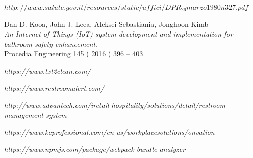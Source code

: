 \documentclass[12pt]{article}
\begin{document}
\begin{thebibliography}{9}
\textit{$http://www.salute.gov.it/resources/static/uffici/DPR_26marzo1980n327.pdf$}

Dan D. Kooa, John J. Leea, Aleksei Sebastiania, Jonghoon Kimb \\
\textit{An Internet-of-Things (IoT) system development and
implementation for bathroom safety enhancement}.\\
Procedia Engineering 145 ( 2016 ) 396 – 403 

\textit{https://www.txt2clean.com/}

\textit{https://www.restroomalert.com/}

\textit{http://www.advantech.com/iretail-hospitality/solutions/detail/restroom-management-system}

\textit{https://www.kcprofessional.com/en-us/workplacesolutions/onvation}

\textit{https://www.npmjs.com/package/webpack-bundle-analyzer}

\end{thebibliography}

\end{document}
